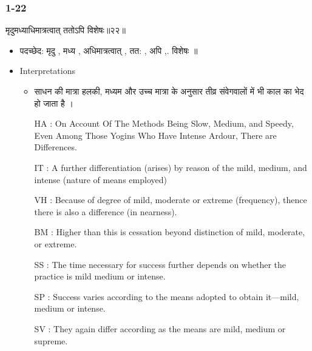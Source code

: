 \begin{frame}[fragile]\frametitle{1-22}
\begin{sanskrit}
मृदुमध्याधिमात्रत्वात् ततोऽपि विशेषः॥२२॥
\end{sanskrit}

	\begin{itemize}
	\item पदच्छेद: मृदु , मध्य , अधिमात्रत्वात् , तत: , अपि ,. विशेषः ॥
	\item Interpretations
		\begin{itemize}	
		\item साधन की मात्रा हलकी, मध्यम और उच्च मात्रा के अनुसार तीव्र संवेगवालों में भी काल का भेद हो जाता है ।
		\item [HA]: On Account Of The Methods Being Slow, Medium, and Speedy, Even Among Those Yogins Who Have Intense Ardour, There are Differences.
		\item [IT]: A further differentiation (arises) by reason of the mild, medium, and intense (nature of means employed)
		\item [VH]: Because of degree of mild, moderate or extreme (frequency), thence there is also a difference (in nearness).
		\item [BM]: Higher than this is cessation beyond distinction of mild, moderate, or extreme.
		\item [SS]: The time necessary for success further depends on whether the practice is mild medium or intense.
		\item [SP]: Success varies according to the means adopted to obtain it—mild, medium or intense.
		\item [SV]: They again differ according as the means are mild, medium or supreme. 
		\end{itemize}
	\end{itemize}
	
\end{frame}


